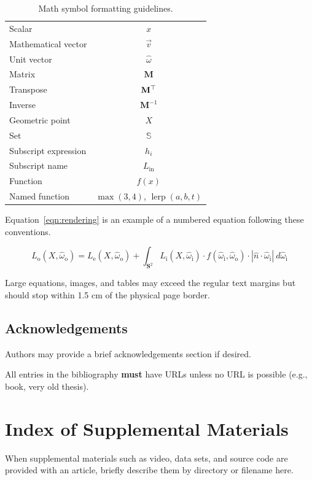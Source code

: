 \documentclass{jcgt}
\begin{document}
\begin{table}[htdp]
\small
\begin{center}
\begin{tabular}{l|c}
Scalar & $x$\\
Mathematical vector & $\vec{v}$ \\
Unit vector & $\hat{\omega}$ \\
Matrix & $\mathbf{M}$ \\
Transpose & $\mathbf{M}^\top$\\
Inverse & $\mathbf{M}^{-1}$\\
Geometric point & $X$ \\
Set & $\mathbb{S}$ \\
Subscript expression & $h_i$ \\
Subscript name & $L_\mathrm{in}$ \\
Function & $f(x)$ \\
Named function & $\max(3, 4)$, $\operatorname{lerp}(a, b, t)$
\end{tabular}
\end{center}
\caption{Math symbol formatting guidelines.}
\label{tbl:math}
\end{table}

\noindent Equation~\ref{eqn:rendering} is an example of a numbered equation following these conventions.

\begin{equation}
L_\mathrm{o}(X, \hat{\omega}_\mathrm{o}) = L_\mathrm{e}(X, \hat{\omega}_\mathrm{o}) + \int_{\mathbf{S}^2} L_\mathrm{i}(X, \hat{\omega}_\mathrm{i}) \cdot f(\hat{\omega}_\mathrm{i}, \hat{\omega}_\mathrm{o}) \cdot |\hat{n} \cdot \hat{\omega}_\mathrm{i} |~ d\hat{\omega}_\mathrm{i}
\label{eqn:rendering}
\end{equation}

Large equations, images, and tables may exceed the regular text margins but should stop within 1.5 cm of the physical page border.

\subsection*{Acknowledgements}
Authors may provide a brief acknowledgements section if desired. 

All entries in the bibliography \textbf{must} have URLs unless no URL is possible (e.g., book, very old thesis).

\small



\section*{Index of Supplemental Materials}
When supplemental materials such as video, data sets, and source code are provided with an article, briefly describe them by directory or filename here.
\end{document}
